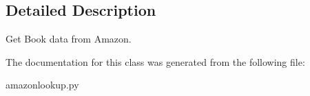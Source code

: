 \subsection{Detailed Description}
\begin{DoxyVerb}Get Book data from Amazon.

\end{DoxyVerb}
 

The documentation for this class was generated from the following file:\begin{DoxyCompactItemize}
\item 
amazonlookup.py\end{DoxyCompactItemize}
